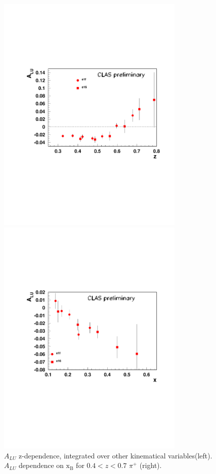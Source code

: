 \documentclass[11pt,a4paper]{article}
\newcommand{\xbj}{\mathrm{x_{B}}}
\begin{document}
\begin{figure}
\begin{minipage}{.6\textwidth}
\includegraphics[width=9cm]{plots/dr-b2b-pip-z-bin36-z04-07-x01-06-pt0-065-min2.pdf}
\end{minipage}
\begin{minipage}{.6\textwidth}
\includegraphics[width=9cm]{plots/dr-b2b-pip-xf-bin36-noexc-acc-xm-aluvsmmas-new-dsin2-z04-07-x01-06-pt0-065-min2.pdf}
\end{minipage}
   \caption{$A_{LU}$ z-dependence, integrated over other kinematical variables(left). 
$A_{LU}$ dependence on $\xbj$ for $0.4<z<0.7$ $\pi^+$ (right).}
 \label{fig:b2bpt}
 \end{figure} 
\end{document}
